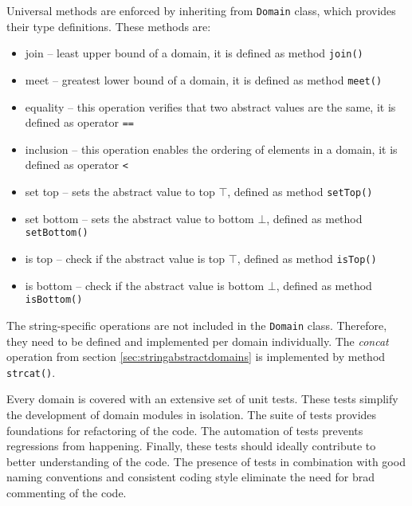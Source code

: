 \documentclass[12pt,final,oneside]{fithesis2}
\theoremstyle{definition}
\begin{document}
Universal methods are enforced by inheriting from \texttt{Domain} class,
which provides their type definitions. These methods are:

\begin{itemize}

\item join -- least upper bound of a domain, it is defined as method
\texttt{join()}

\item meet -- greatest lower bound of a domain, it is defined as method
\texttt{meet()}

\item equality -- this operation verifies that two abstract values are the same,
it is defined as operator \texttt{==}

\item inclusion -- this operation enables the ordering of elements in a domain,
it is defined as operator \texttt{<}

\item set top -- sets the abstract value to top $\top$, defined as method
\texttt{setTop()}

\item set bottom -- sets the abstract value to bottom $\bot$, defined as method
\texttt{setBottom()}

\item is top -- check if the abstract value is top $\top$, defined as method
\texttt{isTop()}

\item is bottom -- check if the abstract value is bottom $\bot$, defined as
method \texttt{isBottom()}

\end{itemize}

The string-specific operations are not included in the \texttt{Domain} class.
Therefore, they need to be defined and implemented per domain individually.
The \textit{concat} operation from section \ref{sec:stringabstractdomains} is
implemented by method \texttt{strcat()}.

Every domain is covered with an extensive set of unit tests. These tests simplify
the development of domain modules in isolation. The suite of tests provides
foundations for refactoring of the code. The automation of tests
prevents regressions from happening. Finally, these tests should ideally
contribute to better understanding of the code. The presence of tests in
combination with good naming conventions and consistent coding style eliminate
the need for brad commenting of the code.
\end{document}
